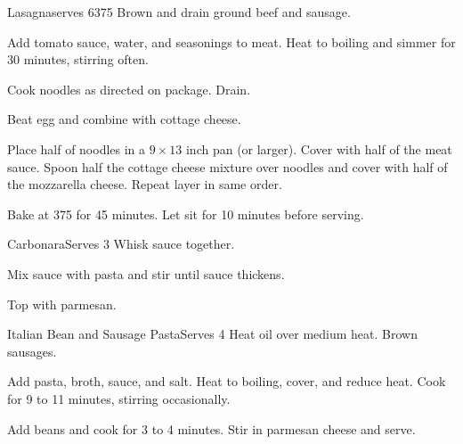 
\begin{recipe}{Lasagna}{serves 6}{375\0}
    Brown and drain ground beef and sausage.

    Add tomato sauce, water, and seasonings to meat. Heat to boiling and simmer for 30 minutes, stirring often.

    Cook noodles as directed on package. Drain.

    Beat egg and combine with cottage cheese.

    Place half of noodles in a $9 \times 13$ inch pan (or larger). Cover with half of the meat sauce. Spoon half the cottage cheese mixture over noodles and cover with half of the mozzarella cheese. Repeat layer in same order.

    \newstep
    Bake at 375\0 for 45 minutes. Let sit for 10 minutes before serving.
\end{recipe}

\begin{recipe}{Carbonara}{Serves 3}{}
    Whisk sauce together.

    Mix sauce with pasta and stir until sauce thickens.

    Top with parmesan.
\end{recipe}

\begin{recipe}{Italian Bean and Sausage Pasta}{Serves 4}{}
    Heat oil over medium heat. Brown sausages.

    Add pasta, broth, sauce, and salt. Heat to boiling, cover, and reduce heat. Cook for 9 to 11 minutes, stirring occasionally.

    Add beans and cook for 3 to 4 minutes. Stir in parmesan cheese and serve.
\end{recipe}

